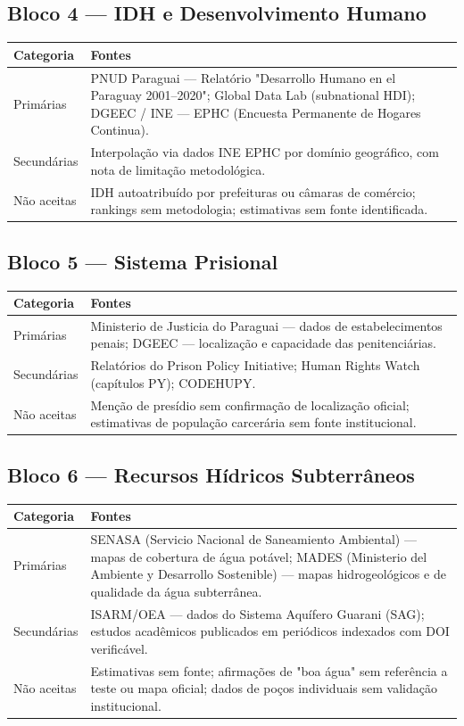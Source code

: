 \subsection*{Bloco 4 — IDH e Desenvolvimento Humano}

\begin{tabularx}{\linewidth}{lX}
\toprule
\textbf{Categoria} & \textbf{Fontes} \\
\midrule
Primárias    & PNUD Paraguai — Relatório "Desarrollo Humano en el Paraguay 2001--2020"; Global Data Lab (subnational HDI); DGEEC / INE — EPHC (Encuesta Permanente de Hogares Continua). \\
Secundárias  & Interpolação via dados INE EPHC por domínio geográfico, com nota de limitação metodológica. \\
Não aceitas  & IDH autoatribuído por prefeituras ou câmaras de comércio; rankings sem metodologia; estimativas sem fonte identificada. \\
\bottomrule
\end{tabularx}

\subsection*{Bloco 5 — Sistema Prisional}

\begin{tabularx}{\linewidth}{lX}
\toprule
\textbf{Categoria} & \textbf{Fontes} \\
\midrule
Primárias    & Ministerio de Justicia do Paraguai — dados de estabelecimentos penais; DGEEC — localização e capacidade das penitenciárias. \\
Secundárias  & Relatórios do Prison Policy Initiative; Human Rights Watch (capítulos PY); CODEHUPY. \\
Não aceitas  & Menção de presídio sem confirmação de localização oficial; estimativas de população carcerária sem fonte institucional. \\
\bottomrule
\end{tabularx}

\subsection*{Bloco 6 — Recursos Hídricos Subterrâneos}

\begin{tabularx}{\linewidth}{lX}
\toprule
\textbf{Categoria} & \textbf{Fontes} \\
\midrule
Primárias    & SENASA (Servicio Nacional de Saneamiento Ambiental) — mapas de cobertura de água potável; MADES (Ministerio del Ambiente y Desarrollo Sostenible) — mapas hidrogeológicos e de qualidade da água subterrânea. \\
Secundárias  & ISARM/OEA — dados do Sistema Aquífero Guarani (SAG); estudos acadêmicos publicados em periódicos indexados com DOI verificável. \\
Não aceitas  & Estimativas sem fonte; afirmações de "boa água" sem referência a teste ou mapa oficial; dados de poços individuais sem validação institucional. \\
\bottomrule
\end{tabularx}

